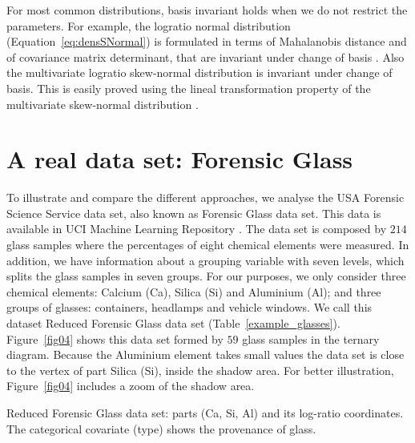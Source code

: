\documentclass[12pt, a4paper]{article}
\begin{document}
For most common distributions, basis invariant holds when we do not restrict the parameters. For example, the logratio normal distribution (Equation~\ref{eq:densSNormal}) is formulated in terms of Mahalanobis distance and of covariance matrix determinant, that are invariant under change of basis  \citep{barcelo1999comment}. Also the multivariate logratio skew-normal distribution is invariant under change of basis. This is easily proved using the lineal transformation property of the multivariate skew-normal distribution \citep{azzalini1999statistical}.

\section{A real data set: Forensic Glass}
\label{example_section}

\noindent To illustrate and compare the different approaches, we analyse the USA Forensic Science Service data set, also known as Forensic Glass data set. This data is available in UCI Machine Learning Repository \citep{uci2007repository}.  The data set is composed by  $214$ glass samples where the percentages of eight chemical elements were measured. In addition, we have information about a grouping variable with seven levels, which splits the glass samples in seven groups. For our purposes, we only consider three chemical elements: Calcium (Ca), Silica (Si) and Aluminium (Al); and three groups of glasses: containers, headlamps and vehicle windows. We call this dataset Reduced Forensic Glass data set (Table~\ref{example_glasses}). Figure~\ref{fig04} shows this data set formed by $59$ glass samples in the ternary diagram. Because the Aluminium element takes small values the data set is close to the vertex of part Silica (Si), inside the shadow area. For better illustration, Figure~\ref{fig04} includes a zoom of the shadow area.


\begin{table}
\centering
\scriptsize


%
\caption{Reduced Forensic Glass data set: parts (Ca, Si, Al) and its log-ratio coordinates. 
The categorical covariate  (type) shows the provenance of glass.}
\label{example_glasses}
\end{table}

% 
% 
\end{document}

